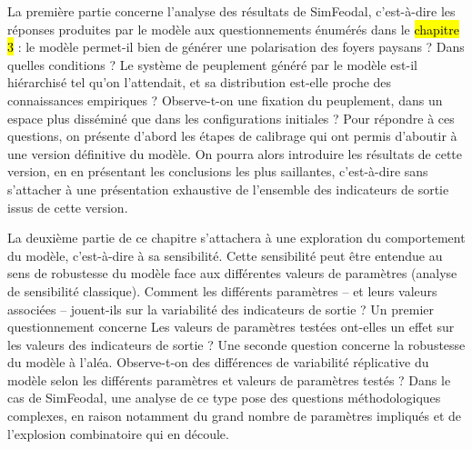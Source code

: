 La première partie concerne l'analyse des \og résultats\fg{} de SimFeodal, c'est-à-dire les réponses produites par le modèle aux questionnements énumérés dans le \hl{chapitre 3} :
le modèle permet-il bien de générer une polarisation des foyers paysans ? Dans quelles conditions ?
Le système de peuplement généré par le modèle est-il hiérarchisé tel qu'on l'attendait, et sa distribution est-elle proche des connaissances empiriques ?
Observe-t-on une fixation du peuplement, dans un espace plus disséminé que dans les configurations initiales ?
Pour répondre à ces questions, on présente d'abord les étapes de calibrage qui ont permis d'aboutir à une version \og définitive\fg{} du modèle.
On pourra alors introduire les résultats de cette version, en en présentant les conclusions les plus saillantes, c'est-à-dire sans s'attacher à une présentation exhaustive de l'ensemble des indicateurs de sortie issus de cette version.

La deuxième partie de ce chapitre s'attachera à une exploration du comportement du modèle, c'est-à-dire à sa sensibilité.
Cette sensibilité peut être entendue au sens de robustesse du modèle face aux différentes valeurs de paramètres (analyse de sensibilité classique).
Comment les différents paramètres -- et leurs valeurs associées -- jouent-ils sur la variabilité des indicateurs de sortie ?
Un premier questionnement concerne
Les valeurs de paramètres testées ont-elles un effet sur les valeurs des indicateurs de sortie ?
Une seconde question concerne la robustesse du modèle à l'aléa.
Observe-t-on des différences de variabilité réplicative du modèle selon les différents paramètres et valeurs de paramètres testés ?
Dans le cas de SimFeodal, une analyse de ce type pose des questions méthodologiques complexes, en raison notamment du grand nombre de paramètres impliqués et de \og l'explosion combinatoire\fg{} qui en découle.


